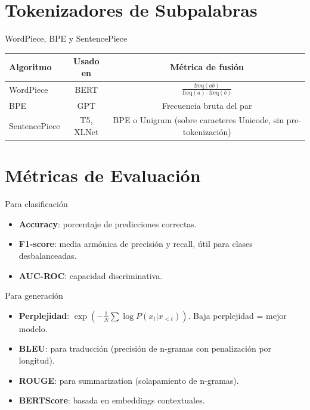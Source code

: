 \documentclass[aspectratio=169, 10pt, xcolor=table]{beamer}
\begin{document}
\section{Tokenizadores de Subpalabras}

\begin{frame}{WordPiece, BPE y SentencePiece}
    \begin{table}
        \centering
        \begin{tabular}{l|c|c}
            \toprule
            \textbf{Algoritmo} & \textbf{Usado en} & \textbf{Métrica de fusión} \\
            \midrule
            WordPiece & BERT & $\frac{\text{freq}(ab)}{\text{freq}(a)\cdot\text{freq}(b)}$ \\
            BPE & GPT & Frecuencia bruta del par \\
            SentencePiece & T5, XLNet & BPE o Unigram (sobre caracteres Unicode, sin pre-tokenización) \\
            \bottomrule
        \end{tabular}
    \end{table}
\end{frame}

\section{Métricas de Evaluación}

\begin{frame}{Para clasificación}
    \begin{itemize}
        \item \textbf{Accuracy}: porcentaje de predicciones correctas.
        \item \textbf{F1-score}: media armónica de precisión y recall, útil para clases desbalanceadas.
        \item \textbf{AUC-ROC}: capacidad discriminativa.
    \end{itemize}
\end{frame}

\begin{frame}{Para generación}
    \begin{itemize}
        \item \textbf{Perplejidad}: $\exp\left(-\frac{1}{N}\sum \log P(x_t|x_{<t})\right)$. Baja perplejidad = mejor modelo.
        \item \textbf{BLEU}: para traducción (precisión de n-gramas con penalización por longitud).
        \item \textbf{ROUGE}: para summarization (solapamiento de n-gramas).
        \item \textbf{BERTScore}: basada en embeddings contextuales.
    \end{itemize}
\end{frame}
\end{document}
